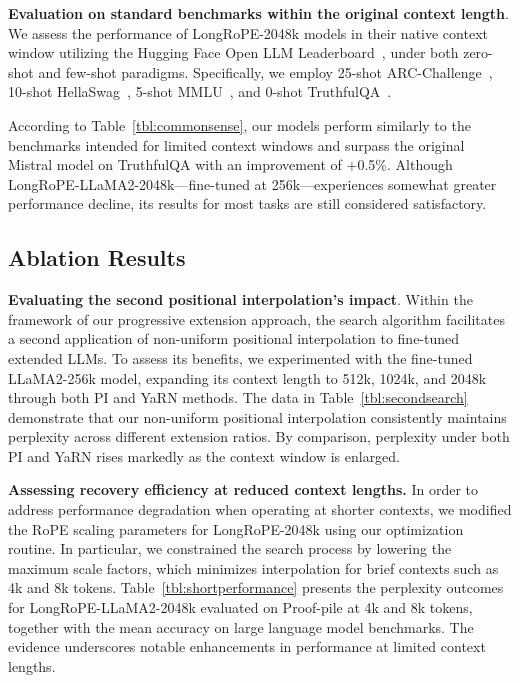 \textbf{Evaluation on standard benchmarks within the original context length}. We assess the performance of LongRoPE-2048k models in their native context window utilizing the Hugging Face Open LLM Leaderboard~\cite{huggingfaceboard}, under both zero-shot and few-shot paradigms. Specifically, we employ 25-shot ARC-Challenge~\cite{allenai:arc}, 10-shot HellaSwag~\cite{zellers2019hellaswag}, 5-shot MMLU~\cite{mmlu}, and 0-shot TruthfulQA~\cite{lin2021truthfulqa}.

According to Table~\ref{tbl:commonsense}, our models perform similarly to the benchmarks intended for limited context windows and surpass the original Mistral model on TruthfulQA with an improvement of +0.5\%. Although LongRoPE-LLaMA2-2048k—fine-tuned at 256k—experiences somewhat greater performance decline, its results for most tasks are still considered satisfactory.

\subsection{Ablation Results}

\textbf{Evaluating the second positional interpolation's impact}. Within the framework of our progressive extension approach, the search algorithm facilitates a second application of non-uniform positional interpolation to fine-tuned extended LLMs. To assess its benefits, we experimented with the fine-tuned LLaMA2-256k model, expanding its context length to 512k, 1024k, and 2048k through both PI and YaRN methods. The data in Table~\ref{tbl:secondsearch} demonstrate that our non-uniform positional interpolation consistently maintains perplexity across different extension ratios. By comparison, perplexity under both PI and YaRN rises markedly as the context window is enlarged.

\textbf{Assessing recovery efficiency at reduced context lengths.} In order to address performance degradation when operating at shorter contexts, we modified the RoPE scaling parameters for LongRoPE-2048k using our optimization routine. In particular, we constrained the search process by lowering the maximum scale factors, which minimizes interpolation for brief contexts such as 4k and 8k tokens. Table~\ref{tbl:shortperformance} presents the perplexity outcomes for LongRoPE-LLaMA2-2048k evaluated on Proof-pile at 4k and 8k tokens, together with the mean accuracy on large language model benchmarks. The evidence underscores notable enhancements in performance at limited context lengths.

